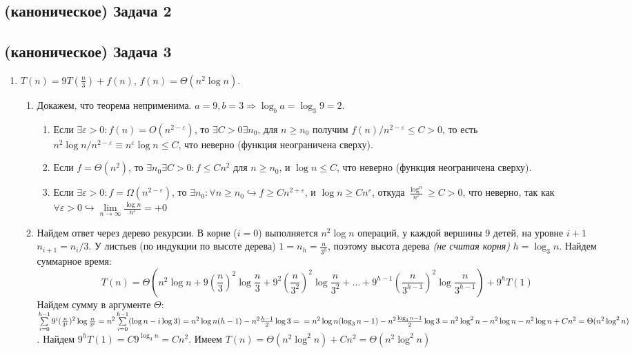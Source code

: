 \documentclass[a4paper]{article}
\def\eps{\varepsilon}
\begin{document}
\subsection*{(каноническое) Задача 2}
\subsection*{(каноническое) Задача 3}
\begin{enumerate}
\item $T(n)=9T(\frac{n}{3})+f(n)$, $f(n)=\Theta(n^2\log n)$.
\begin{enumerate}
\item Докажем, что теорема неприменима. $a=9,b=3\Rightarrow \log_b a=\log_3 9=2$.
\begin{enumerate}
\item Если $\exists \eps>0\colon f(n)=O(n^{2-\eps})$, то $\exists C>0\exists n_0$, для $n\geqslant n_0$ получим $f(n)/n^{2-\varepsilon}\leqslant C>0$, то есть $n^2\log n/n^{2-\eps}\equiv n^\varepsilon\log n\leqslant C$, что неверно (функция неограничена сверху).
\item Если $f=\Theta(n^2)$, то $\exists n_0\exists C>0\colon f\leqslant Cn^2$ для $n\geqslant n_0$, и $\log n\leqslant C$, что неверно (функция неограничена сверху).
\item Если $\exists \eps>0\colon f=\Omega(n^{2-\eps})$, то $\exists n_0\colon\forall n\geqslant n_0\hookrightarrow f\geqslant Cn^{2+\eps}$, и $\log n\geqslant Cn^\eps$, откуда $\frac{\log^n}{n^\eps}\geqslant C>0$, что неверно, так как $\forall\eps>0\hookrightarrow\lim\limits_{n\to\infty}\frac{\log n}{n^\eps}=+0$
\end{enumerate}
\item Найдем ответ через дерево рекурсии. В корне ($i=0$) выполняется $n^2\log n$ операций, у каждой вершины 9 детей, на уровне $i+1$ $n_{i+1}=n_i/3$. У листьев (по индукции по высоте дерева) $1=n_h=\frac{n}{3^h}$, поэтому высота дерева {\em (не считая корня)} $h=\log_3n$. Найдем суммарное время:
$$T(n)=\Theta(n^2\log n+9(\frac{n}{3})^2\log\frac{n}{3}+9^2(\frac{n}{3^2})^2\log\frac{n}{3^2}+...+9^{h-1}(\frac{n}{3^{h-1}})^2\log\frac{n}{3^{h-1}})+9^hT(1)$$
Найдем сумму в аргументе $\Theta$: $\sum\limits_{i=0}^{h-1}9^i(\frac{n}{3^i})^2\log\frac{n}{3^i}=n^2\sum\limits_{i=0}^{h-1}(\log n-i\log 3)=n^2\log n(h-1)-n^2\frac{h-1}{2}\log 3=\newline=n^2\log n(\log_3n-1)-n^2\frac{\log_3n-1}{2}\log 3=n^2\log^2n-n^2\log n-n^2\log n+Cn^2=\Theta(n^2\log^2 n)$.\newline
Найдем $9^hT(1)=C9^{\log_3 n}=Cn^2$. Имеем $T(n)=\Theta(n^2\log^2n)+Cn^2=\boxed{\Theta(n^2\log^2n)}$

\end{enumerate}
\end{enumerate}
\end{document}
